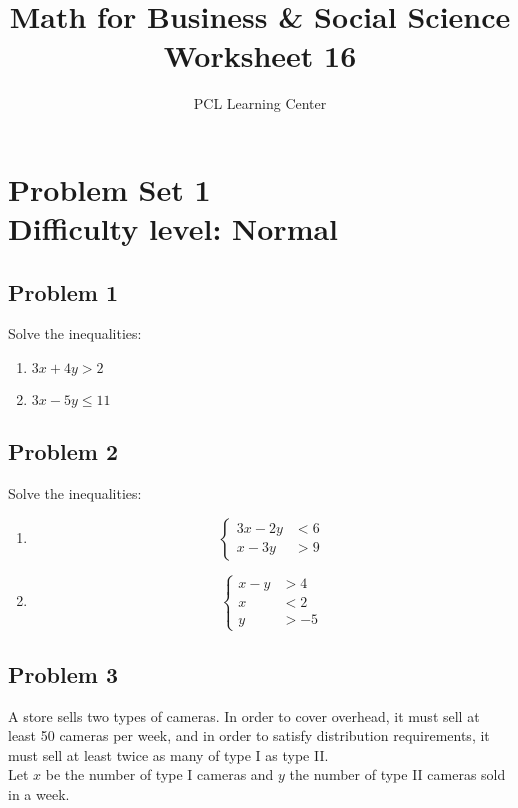 \documentclass[12pt]{article}
\title{Math for Business \& Social Science\\ Worksheet 16}
\author{PCL Learning Center}
\date{}
\begin{document}
\maketitle

\section*{Problem Set 1\\Difficulty level: Normal}
\subsection*{Problem 1}
Solve the inequalities:
\begin{enumerate}[label=\alph*)]
    \item \( 3x + 4y > 2 \)
    \item \( 3x - 5y \leq 11 \)
\end{enumerate}

\subsection*{Problem 2}
Solve the inequalities:
\begin{enumerate}[label=\alph*)]
    \item 
    \[
    \left\{
    \begin{aligned}
        3x - 2y &< 6 \\
        x - 3y &> 9
    \end{aligned}
    \right.
    \]
    \item 
    \[
    \left\{
    \begin{aligned}
        x - y &> 4 \\
        x &< 2 \\
        y &> -5
    \end{aligned}
    \right.
    \]
\end{enumerate}

\subsection*{Problem 3}
A store sells two types of cameras. In order to cover overhead, it must sell at least 50 cameras per week, and in order to satisfy distribution requirements, it must sell at least twice as many of type I as type II.\\

Let \(x\) be the number of type I cameras and \(y\) the number of type II cameras sold in a week.\\
\end{document}
